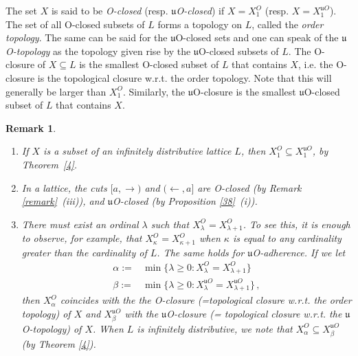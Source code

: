 \documentclass[12pt,a4paper]{amsart}
\numberwithin{equation}{section}
\newtheorem{remark}{Remark}
\theoremstyle{definition}
\newcommand{\sss}[1]{{\scriptscriptstyle #1}}
\begin{document}
The set $ X$ is said to be \textit{O-closed} (resp. \textit{$\mathfrak{u}$O-closed}) if $ X= X^{\sss{O}}_1$ (resp. $ X= X^{\sss{\mathfrak{u}O}}_1$).  The set of all O-closed subsets of $ L$ forms a topology on $ L$, called the \textit{order topology}. The same can be said for the $\mathfrak u$O-closed sets and one can speak of the\textit{ $\mathfrak u$O-topology} as the topology given rise by the $\mathfrak{u}$O-closed subsets of $ L$. The O-closure of $ X\subseteq L$ is the smallest O-closed subset of $ L$ that contains $ X$, i.e. the O-closure is the topological closure w.r.t. the order topology.  Note that this will generally be larger than $ X^{\sss{O}}_1$.  
Similarly, the $\mathfrak u$O-closure is the smallest $\mathfrak u$O-closed subset of $ L$ that contains $ X$.  



\begin{remark}\label{rem2}
\begin{enumerate}[{\rm(i)}]
    \item  If $ X$ is a subset of an infinitely distributive lattice $ L$, then $ X^{\sss{O}}_1\subseteq X^{\sss{\mathfrak{u}O}}_1$, by Theorem~\ref{4}. \\
     \item In a lattice, the cuts $[a,\rightarrow)$ and $(\leftarrow,a]$ are O-closed (by Remark \ref{remark}~{\rm(iii)}), and  $\mathfrak{u}$O-closed (by Proposition \ref{38}~{\rm(i)}).    \\
  \item There must exist an ordinal $\lambda$ such that $ X^{\sss{O}}_\lambda= X^{\sss{O}}_{\lambda+1}$. To see this, it is enough to observe, for example, that $ X^{\sss{O}}_\kappa =  X^{\sss{O}}_{\kappa+1}$ when $\kappa$ is equal to any cardinality greater than the cardinality of $ L$.  The same holds for $\mathfrak{u}$O-adherence.  If we let 
    \begin{align*}
    \alpha:=&\min\{\lambda\ge 0: X^{\sss{O}}_\lambda= X^{\sss{O}}_{\lambda+1}\}\\
    \beta:=&\min\{\lambda\ge 0: X^{\sss{\mathfrak{u}O}}_\lambda= X^{\sss{\mathfrak{u}O}}_{\lambda+1}\}\,,
    \end{align*}
    then  $ X^{\sss{O}}_\alpha$ coincides with the  the O-closure (=topological closure w.r.t. the order topology) of $ X$ and $ X^{\sss{\mathfrak{u}O}}_\beta$ with the $\mathfrak u$O-closure (= topological closure w.r.t. the $\mathfrak{u}$O-topology) of $ X$.  When $ L$ is infinitely distributive, we note that $ X^{\sss{O}}_\alpha\subseteq  X^{\sss{\mathfrak{u}O}}_\beta$ (by Theorem \ref{4}).
\end{enumerate}
   \end{remark}
\end{document}
